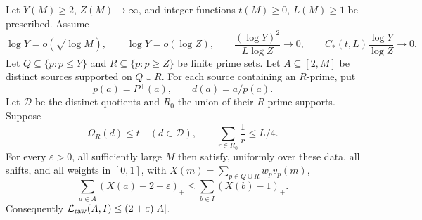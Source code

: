 \begin{theorem}
\label{ss:general}
Let $Y(M)\ge2$, $Z(M)\to\infty$, and integer functions $t(M)\ge0$,
$L(M)\ge1$ be prescribed. Assume
\begin{equation}
 \log Y=o(\sqrt{\log M}),\qquad
 \log Y=o(\log Z),\qquad
 \frac{(\log Y)^2}{L\log Z}\to0,\qquad
 C_*(t,L)\frac{\log Y}{\log Z}\to0.
 \label{ss:general-conditions}
\end{equation}
Let $Q\subseteq\{p:p\le Y\}$ and $R\subseteq\{p:p\ge Z\}$ be finite
prime sets. Let $A\subseteq[2,M]$ be distinct sources supported on
$Q\cup R$. For each source containing an $R$-prime, put
\[
 p(a)=P^+(a),\qquad d(a)=a/p(a).
\]
Let $\mathcal D$ be the distinct quotients and $R_0$ the union of their
$R$-prime supports. Suppose
\[
 \Omega_R(d)\le t\quad(d\in\mathcal D),
 \qquad \sum_{r\in R_0}\frac1r\le L/4.
\]
For every $\varepsilon>0$, all sufficiently large $M$ then satisfy,
uniformly over these data, all shifts, and all weights in $[0,1]$,
with $X(m)=\sum_{p\in Q\cup R}w_pv_p(m)$,
\begin{equation}
 \sum_{a\in A}(X(a)-2-\varepsilon)_+
 \le \sum_{b\in I}(X(b)-1)_+.
 \label{ss:shared-hinge}
\end{equation}
Consequently $\mathcal L_{\rm raw}(A,I)\le(2+\varepsilon)|A|$.
\end{theorem}


